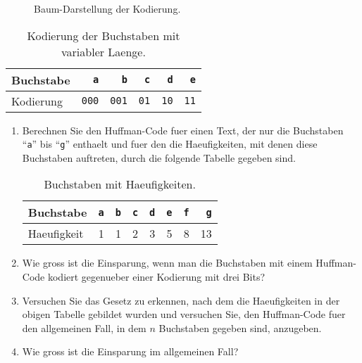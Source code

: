 \begin{figure}[!ht]
  \centering
  \caption{Baum-Darstellung der Kodierung.}
  \label{fig:coding-tree2}
\end{figure}



\begin{table}[htbp]
  \centering
\begin{tabular}[t]{|l|r|r|r|r|r|}
\hline
Buchstabe &   \texttt{a} &   \texttt{b} & \texttt{c}  & \texttt{d}  & \texttt{e}   \\
\hline
Kodierung & \texttt{000} & \texttt{001} & \texttt{01} & \texttt{10} & \texttt{11} \\
\hline
\end{tabular}
  \caption{Kodierung der Buchstaben mit variabler Laenge.}
  \label{tab:coding2}
\end{table}


\exercise
\begin{enumerate}
\item Berechnen Sie den Huffman-Code fuer einen Text, der nur die Buchstaben
      ``\texttt{a}'' bis ``\texttt{g}'' enthaelt und fuer den die Haeufigkeiten,
      mit denen diese Buchstaben auftreten, durch die folgende Tabelle gegeben sind.

\begin{table}[htbp]
  \centering
\begin{tabular}[t]{|l|r|r|r|r|r|r|r|}
\hline
Buchstabe  & \texttt{a} & \texttt{b} & \texttt{c} & \texttt{d} & \texttt{e} & \texttt{f} & \texttt{g} \\
\hline
Haeufigkeit &          1 &          1 &          2 &          3 &          5 &         8 &         13 \\
\hline
\end{tabular}
  \caption{Buchstaben mit Haeufigkeiten.}
  \label{tab:aufgabe-huffman}
\end{table}

\item Wie gross ist die Einsparung, wenn man die Buchstaben mit einem Huffman-Code
      kodiert gegenueber einer Kodierung mit drei Bits?
\item Versuchen Sie das Gesetz zu erkennen, nach dem die Haeufigkeiten in der obigen Tabelle 
      gebildet wurden und versuchen Sie, den Huffman-Code fuer den allgemeinen Fall,
      in dem $n$ Buchstaben gegeben sind, anzugeben.
\item Wie gross ist die Einsparung im allgemeinen Fall?
\end{enumerate}

